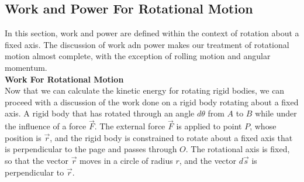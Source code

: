 \documentclass[a4paper]{article}
\let\bf\textbf
\begin{document}
\subsection{Work and Power For Rotational Motion}
In this section, work and power are defined within the context of rotation about a fixed axis. The discussion of work adn power makes our treatment of rotational motion almost complete, with the exception of rolling motion and angular momentum.
\vspace{2mm}\\
\bf{Work For Rotational Motion}
\vspace{2mm}\\
Now that we can calculate the kinetic energy for rotating rigid bodies, we can proceed with a discussion of the work done on a rigid body rotating about a fixed axis. A rigid body that has rotated through an angle $d\theta$ from $A$ to $B$ while under the influence of a force $\vec{F}$. The external force $\vec{F}$ is applied to point $P$, whose position is $\vec{r}$, and the rigid body is constrained to rotate about a fixed axis that is perpendicular to the page and passes through $O$. The rotational axis is fixed, so that the vector $\vec{r}$ moves in a circle of radius $r$, and the vector $d\vec{s}$ is perpendicular to $\vec{r}$.
\begin{center}
\end{center}
\end{document}
